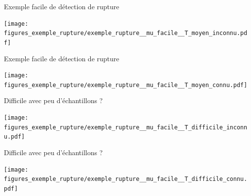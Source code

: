 \documentclass[11pt,french,ignorenonframetext,]{beamer}
\begin{document}
\begin{frame}[plain]{Exemple facile de détection de rupture}
  \begin{center}
    \texttt{[image: figures\_exemple\_rupture/exemple\_rupture\_\_mu\_facile\_\_T\_moyen\_inconnu.pdf]}
  \end{center}
\end{frame}
\begin{frame}[plain]{Exemple facile de détection de rupture}
  \begin{center}
    \texttt{[image: figures\_exemple\_rupture/exemple\_rupture\_\_mu\_facile\_\_T\_moyen\_connu.pdf]}
  \end{center}
\end{frame}

\begin{frame}[plain]{Difficile avec peu d'échantillons ?}
  \begin{center}
    \texttt{[image: figures\_exemple\_rupture/exemple\_rupture\_\_mu\_facile\_\_T\_difficile\_inconnu.pdf]}
  \end{center}
\end{frame}
\begin{frame}[plain]{Difficile avec peu d'échantillons ?}
  \begin{center}
    \texttt{[image: figures\_exemple\_rupture/exemple\_rupture\_\_mu\_facile\_\_T\_difficile\_connu.pdf]}
  \end{center}
\end{frame}
\end{document}

